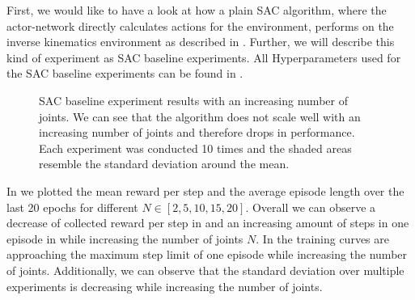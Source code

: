 First, we would like to have a look at how a plain SAC algorithm, where the actor-network directly calculates actions for the environment, performs on the inverse kinematics environment as described in . Further, we will describe this kind of experiment as SAC baseline experiments. All Hyperparameters used for the SAC baseline experiments can be found in .
\begin{figure}[h]
    \begin{center}
        \hfill
    \end{center}
    \caption[SAC baseline experiment results]{SAC baseline experiment results with an increasing number of joints. We can see that the algorithm does not scale well with an increasing number of joints and therefore drops in performance. Each experiment was conducted 10 times and the shaded areas resemble the standard deviation around the mean.}
    \label{fig:SAC_baseline}
\end{figure}

In  we plotted the mean reward per step and the average episode length over the last 20 epochs for different $N \in [2, 5, 10, 15, 20]$. Overall we can observe a decrease of collected reward per step in  and an increasing amount of steps in one episode in  while increasing the number of joints $N$. In  the training curves are approaching the maximum step limit of one episode while increasing the number of joints. Additionally, we can observe that the standard deviation over multiple experiments is decreasing while increasing the number of joints.

